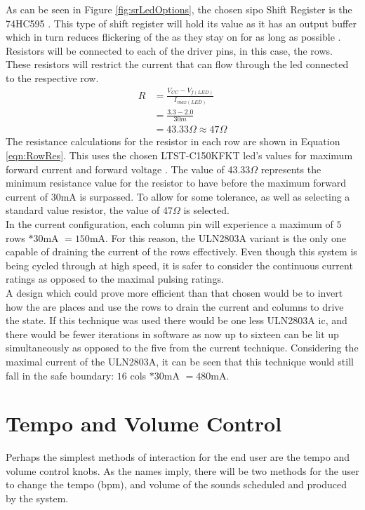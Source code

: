 \documentclass[12pt,a4paper]{report}
\begin{document}
As can be seen in Figure \ref{fig:srLedOptions}, the chosen \ac{sipo} Shift Register is the 74HC595 \cite{595}. This type of shift register will hold its value as it has an output buffer which in turn reduces flickering of the  as they stay on for as long as possible \cite{srOpenMusic}. \\
Resistors will be connected to each of the driver pins, in this case, the rows. These resistors will restrict the current that can flow through the \ac{led} connected to the respective row. 
\begin{equation}
	\label{eqn:RowRes}
	\begin{split}
	R &= \frac{V_{CC} - V_{f(LED)}}{I_{max (LED)}}\\
	&= \frac{3.3 - 2.0}{30m}\\
	&= 43.33\Omega \approx 47\Omega
	\end{split}
\end{equation}
The resistance calculations for the resistor in each row are shown in Equation \ref{eqn:RowRes}. This uses the chosen LTST-C150KFKT \ac{led}'s values for maximum forward current and forward voltage \cite{led}. The value of 43.33$\Omega$ represents the minimum resistance value for the resistor to have before the maximum forward current of 30mA is surpassed. To allow for some tolerance, as well as selecting a standard value resistor, the value of 47$\Omega$ is selected.\\
In the current configuration, each column pin will experience a maximum of $5$ rows $ * 30$mA $=150$mA. For this reason, the ULN2803A variant is the only one capable of draining the current of the rows effectively. Even though this system is being cycled through at high speed, it is safer to consider the continuous current ratings as opposed to the maximal pulsing ratings.\\
A design which could prove more efficient than that chosen would be to invert how the  are places and use the rows to drain the current and columns to drive the state. If this technique was used there would be one less ULN2803A \ac{ic}, and there would be fewer iterations in software as now up to sixteen  can be lit up simultaneously as opposed to the five from the current technique. Considering the maximal current of the ULN2803A, it can be seen that this technique would still fall in the safe boundary: $16$ cols $* 30$mA $=480$mA.
\section{Tempo and Volume Control}
Perhaps the simplest methods of interaction for the end user are the tempo and volume control knobs. As the names imply, there will be two methods for the user to change the tempo (\ac{bpm}), and volume of the sounds scheduled and produced by the system.
\end{document}
